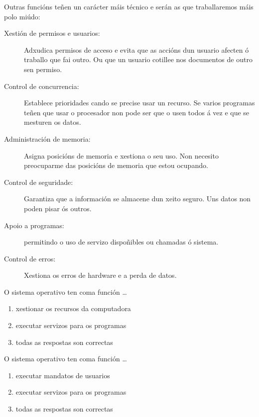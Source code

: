 \begin{singlespace}
Outras funcións teñen un carácter máis técnico e serán as que traballaremos máis polo miúdo:
\begin{description} 
\item[Xestión de permisos e usuarios:] Adxudica permisos de acceso e evita que as accións dun usuario afecten ó traballo que fai outro. Ou que un usuario cotillee nos documentos de outro sen permiso.
\item[Control de concurrencia:] Establece prioridades cando se precise usar un recurso. Se varios programas teñen que usar o procesador non pode ser que o usen todos á vez e que se mesturen os datos.
\item[Administración de memoria:] Asigna posicións de memoria e xestiona o seu uso. Non necesito preocuparme das posicións de memoria que estou ocupando.
\item[Control de seguridade:] Garantiza que a información se almacene dun xeito seguro. Uns datos non poden pisar ós outros.
\item[Apoio a programas:] permitindo o uso de servizo dispoñibles ou chamadas ó sistema.
\item[Control de erros:] Xestiona os erros de hardware e a perda de datos. 
\end{description}
\end{singlespace}


\begin{diapo}\begin{frame}{O sistema operativo ten coma función \dots}
\begin{enumerate}
\item xestionar os recursos da computadora \pause
\item executar servizos para os programas\pause
\item todas as respostas son correctas
\end{enumerate} 
\end{frame} 
\end{diapo}
\begin{diapo}\begin{frame}{O sistema operativo ten coma función \dots}
\begin{enumerate}
\item executar mandatos de usuarios \pause
\item executar servizos para os programas\pause
\item todas as respostas son correctas
\end{enumerate} 
\end{frame}
\end{diapo}

